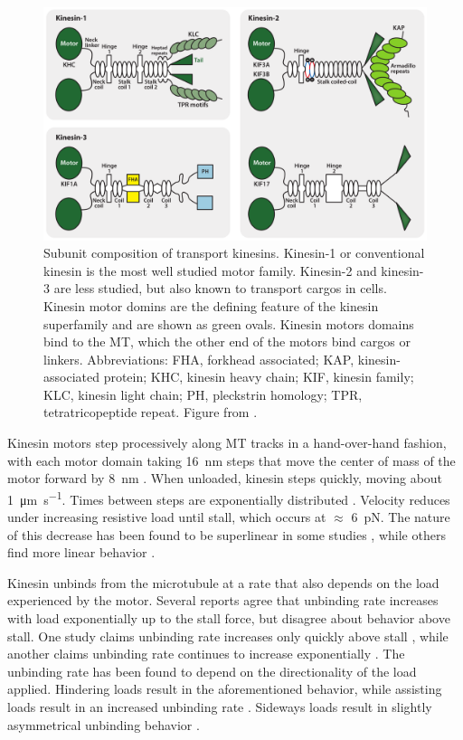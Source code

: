 \begin{figure}
\includegraphics[width=\textwidth]{background/kinesin_types}
\caption[Composition of transport kinesins]{Subunit composition of transport kinesins. Kinesin-1 or conventional kinesin is the most well studied motor family. Kinesin-2 and kinesin-3 are less studied, but also known to transport cargos in cells. Kinesin motor domins are the defining feature of the kinesin superfamily and are shown as green ovals. Kinesin motors domains bind to the MT, which the other end of the motors bind cargos or linkers. Abbreviations: FHA, forkhead associated; KAP, kinesin-associated protein; KHC, kinesin heavy chain; KIF, kinesin family; KLC, kinesin light chain; PH, pleckstrin homology; TPR, tetratricopeptide repeat. Figure from \cite{Verhey2011}.}
\label{fig:kinesin_types}
\end{figure}

Kinesin motors step processively along MT tracks in a hand-over-hand fashion, with each motor domain taking \SI{16}{\nano\meter} steps \cite{Yildiz2004} that move the center of mass of the motor forward by \SI{8}{\nano\meter} \cite{Svoboda1993}. When unloaded, kinesin steps quickly, moving about \SI{1}{\micro\meter\per\second}. Times between steps are exponentially distributed \cite{Carter2005}. Velocity reduces under increasing resistive load until stall, which occurs at $\approx$ \SI{6}{\pico\newton}. The nature of this decrease has been found to be superlinear in some studies \cite{Kunwar2010,Visscher1999,Fallesen2011,Rai2013}, while others find more linear behavior \cite{Svoboda1994,Andreasson2015a}.

Kinesin unbinds from the microtubule at a rate that also depends on the load experienced by the motor. Several reports agree that unbinding rate increases with load exponentially up to the stall force, but disagree about behavior above stall. One study claims unbinding rate increases only quickly above stall \cite{Kunwar2011}, while another claims unbinding rate continues to increase exponentially \cite{Andreasson2015a}. The unbinding rate has been found to depend on the directionality of the load applied. Hindering loads result in the aforementioned behavior, while assisting loads result in an increased unbinding rate \cite{Milic2014,Andreasson2015a}. Sideways loads result in slightly asymmetrical unbinding behavior \cite{Block2003}.

